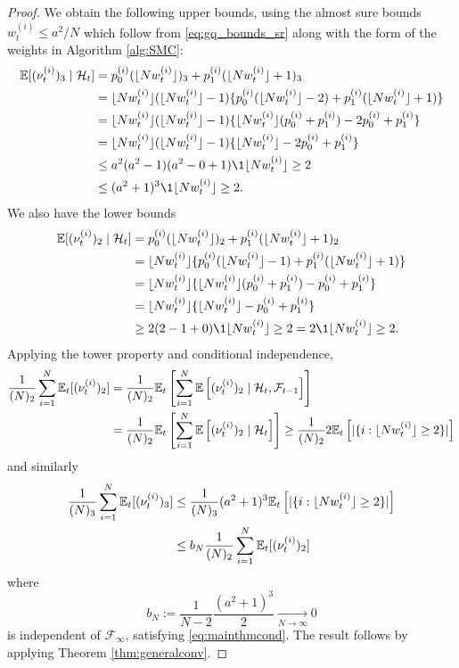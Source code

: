 \begin{proof}
We obtain the following upper bounds, using the almost sure bounds $w_t^{(i)} \leq a^2/N$ which follow from \eqref{eq:gq_bounds_sr} along with the form of the weights in Algorithm \ref{alg:SMC}:
\begin{align*}
\E[(\nu_t^{(i)})_3 \mid \mathcal{H}_t] &= p_0^{(i)} (\flnw)_3 + p_1^{(i)} (\flnw + 1)_3 \\
&= \flnw (\flnw -1) \{ p_0^{(i)} (\flnw -2) + p_1^{(i)} (\flnw +1) \} \\
&= \flnw (\flnw -1) \{ \flnw (p_0^{(i)} + p_1^{(i)}) -2 p_0^{(i)} + p_1^{(i)} \} \\
&= \flnw (\flnw -1) \{ \flnw -2 p_0^{(i)} + p_1^{(i)} \} \\
&\leq a^2 (a^2 -1) (a^2 -0 +1) \1{\flnw \geq 2} \\
&\leq (a^2 +1)^3 \1{\flnw \geq 2} .
\end{align*}
We also have the lower bounds
\begin{align*}
\E[(\nu_t^{(i)})_2 \mid \mathcal{H}_t] &= p_0^{(i)} (\flnw)_2 + p_1^{(i)} (\flnw + 1)_2 \\
&= \flnw \{ p_0^{(i)} (\flnw -1) + p_1^{(i)} (\flnw +1) \} \\
&= \flnw \{ \flnw (p_0^{(i)} + p_1^{(i)}) - p_0^{(i)} + p_1^{(i)} \} \\
&= \flnw \{ \flnw - p_0^{(i)} + p_1^{(i)} \} \\
&\geq 2 (2 -1 +0) \1{\flnw \geq 2} = 2 \1{\flnw \geq 2} .
\end{align*}
Applying the tower property and conditional independence,
\begin{align*}
\frac{1}{(N)_2} \sum_{i=1}^N \mathbb{E}_t [( \nu_t^{(i)} )_2 ] 
&= \frac{1}{(N)_2} \mathbb{E}_t\left[ \sum_{i=1}^N \mathbb{E}\left[ (\nu_t^{(i)})_2 \mid \mathcal{H}_t, \mathcal{F}_{t-1} \right] \right] \\
&= \frac{1}{(N)_2} \mathbb{E}_t\left[ \sum_{i=1}^N \mathbb{E}\left[ (\nu_t^{(i)})_2 \mid \mathcal{H}_t \right] \right]
\geq \frac{1}{(N)_2} 2 \mathbb{E}_t\left[ |\{i:\lfloor N w_t^{(i)} \rfloor\geq 2\}| \right] 
\end{align*}
and similarly
\begin{align*}
\frac{1}{(N)_3} \sum_{i=1}^N \mathbb{E}_t [( \nu_t^{(i)} )_3 ] 
&\leq \frac{1}{(N)_3}  (a^2+1)^3 \mathbb{E}_t\left[ |\{i:\lfloor N w_t^{(i)} \rfloor\geq 2\}| \right] \\
&\leq b_N  \frac{1}{(N)_2} \sum_{i=1}^N \mathbb{E}_t [( \nu_t^{(i)} )_2 ]
\end{align*}
where
\begin{equation*}
b_N := \frac{1}{N-2}\frac{(a^2+1)^3}{2} \underset{N\to\infty}{\longrightarrow} 0
\end{equation*}
is independent of $\mathcal{F}_\infty$, satisfying \eqref{eq:mainthmcond}.
The result follows by applying Theorem \ref{thm:generalconv}.
\end{proof}


